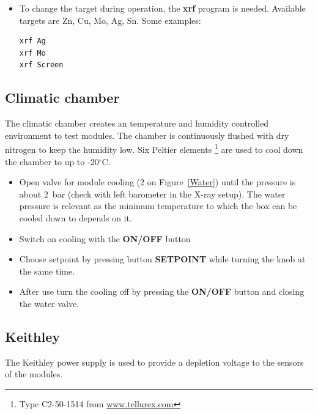 \documentclass[a4paper,12pt,twoside]{article}
\begin{document}
\begin{itemize}
\item {To change the target during operation, the \textbf{xrf} program is needed.  Available targets are Zn, Cu, Mo, Ag, Sn. Some examples:
\begin{Verbatim}[frame=single]
xrf Ag
xrf Mo
xrf Screen
\end{Verbatim}
}
\end{itemize}

\subsection{Climatic chamber}

The climatic chamber creates an temperature and humidity controlled environment to test modules. The chamber is continuously flushed with dry nitrogen to keep the humidity low. Six Peltier elements \footnote{Type C2-50-1514 from \url{www.tellurex.com}} are used to cool down the chamber to up to -20$^\circ$C.

\begin{itemize}
\item Open valve for module cooling (2 on Figure~\ref{Water}) until the pressure is about \SI{2}{\bar} (check with left barometer in the X-ray setup). The water pressure is relevant as the minimum temperature to which the box can be cooled down to depends on it. 
\item Switch on cooling with the \textbf{ON/OFF} button
\item Choose setpoint by pressing button \textbf{SETPOINT} while turning the knob at the same time.
\item After use turn the cooling off by pressing the \textbf{ON/OFF} button and closing the water valve.
\end{itemize}

\subsection{Keithley}
The Keithley power supply is used to provide a depletion voltage to the sensors of the modules. 
\end{document}
